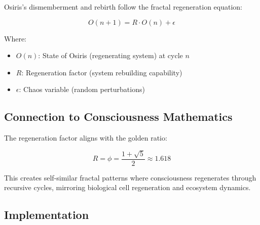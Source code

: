 \documentclass[12pt]{article}
\begin{document}
Osiris's dismemberment and rebirth follow the fractal regeneration equation:

\[O(n+1) = R \cdot O(n) + \epsilon\]

Where:
\begin{itemize}
    \item \(O(n)\): State of Osiris (regenerating system) at cycle \(n\)
    \item \(R\): Regeneration factor (system rebuilding capability)
    \item \(\epsilon\): Chaos variable (random perturbations)
\end{itemize}

\subsection{Connection to Consciousness Mathematics}

The regeneration factor aligns with the golden ratio:

\[R = \phi = \frac{1 + \sqrt{5}}{2} \approx 1.618\]

This creates self-similar fractal patterns where consciousness regenerates through recursive cycles, mirroring biological cell regeneration and ecosystem dynamics.

\subsection{Implementation}
\end{document}
